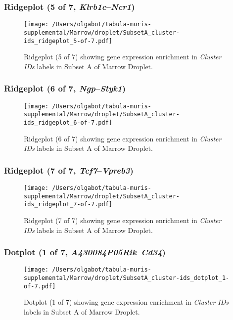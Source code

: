 \clearpage

\subsubsection{Ridgeplot (5 of 7, \emph{Klrb1c}--\emph{Ncr1})}
\begin{figure}[h]
\centering
\texttt{[image: /Users/olgabot/tabula-muris-supplemental/Marrow/droplet/SubsetA\_cluster-ids\_ridgeplot\_5-of-7.pdf]}

\caption{ Ridgeplot (5 of 7)  showing gene expression enrichment in \emph{Cluster IDs} labels in Subset A of Marrow Droplet. }
\end{figure}


\clearpage

\subsubsection{Ridgeplot (6 of 7, \emph{Ngp}--\emph{Styk1})}
\begin{figure}[h]
\centering
\texttt{[image: /Users/olgabot/tabula-muris-supplemental/Marrow/droplet/SubsetA\_cluster-ids\_ridgeplot\_6-of-7.pdf]}

\caption{ Ridgeplot (6 of 7)  showing gene expression enrichment in \emph{Cluster IDs} labels in Subset A of Marrow Droplet. }
\end{figure}


\clearpage

\subsubsection{Ridgeplot (7 of 7, \emph{Tcf7}--\emph{Vpreb3})}
\begin{figure}[h]
\centering
\texttt{[image: /Users/olgabot/tabula-muris-supplemental/Marrow/droplet/SubsetA\_cluster-ids\_ridgeplot\_7-of-7.pdf]}

\caption{ Ridgeplot (7 of 7)  showing gene expression enrichment in \emph{Cluster IDs} labels in Subset A of Marrow Droplet. }
\end{figure}


\clearpage

\subsubsection{Dotplot (1 of 7, \emph{A430084P05Rik}--\emph{Cd34})}
\begin{figure}[h]
\centering
\texttt{[image: /Users/olgabot/tabula-muris-supplemental/Marrow/droplet/SubsetA\_cluster-ids\_dotplot\_1-of-7.pdf]}

\caption{ Dotplot (1 of 7)  showing gene expression enrichment in \emph{Cluster IDs} labels in Subset A of Marrow Droplet. }
\end{figure}


